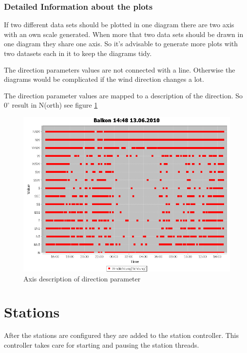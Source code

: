 
\subsubsection{Detailed Information about the plots} %
\label{ssub:detailed_information_about_the_plots}
If two different data sets should be plotted in one diagram there are two axis with an own scale generated. When more that two data sets should be drawn in one diagram they share one axis. So it's advisable to generate more plots with two datasets each in it to keep the diagrams tidy.

The direction parameters values are not connected with a line. Otherwise the diagrams would be complicated if the wind direction changes a lot.

The direction parameter values are mapped to a description of the direction. So $0^\circ$ result in N(orth) see figure \ref{fig:dir}
\begin{figure}[ht]
    \centering
    \includegraphics[width=0.9\linewidth]{master/plot_dir.png}
    \caption{Axis description of direction parameter}
    \label{fig:dir}
\end{figure}

\section{Stations} %
\label{sec:stations}

After the stations are configured they are added to the station controller. This controller takes care for starting and pausing the station threads. 

